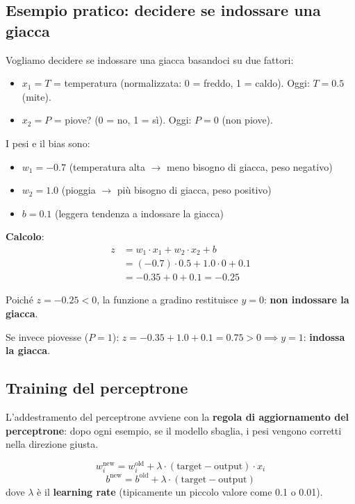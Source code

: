 \documentclass[12pt,a4paper]{article}
\begin{document}
\subsection{Esempio pratico: decidere se indossare una giacca}

\begin{examplebox}
Vogliamo decidere se indossare una giacca basandoci su due fattori:
\begin{itemize}
    \item $x_1 = T$ = temperatura (normalizzata: 0 = freddo, 1 = caldo). Oggi: $T = 0.5$ (mite).
    \item $x_2 = P$ = piove? (0 = no, 1 = s\`i). Oggi: $P = 0$ (non piove).
\end{itemize}

I pesi e il bias sono:
\begin{itemize}
    \item $w_1 = -0.7$ (temperatura alta $\to$ meno bisogno di giacca, peso negativo)
    \item $w_2 = 1.0$ (pioggia $\to$ pi\`u bisogno di giacca, peso positivo)
    \item $b = 0.1$ (leggera tendenza a indossare la giacca)
\end{itemize}

\textbf{Calcolo}:
\begin{align*}
    z &= w_1 \cdot x_1 + w_2 \cdot x_2 + b \\
      &= (-0.7) \cdot 0.5 + 1.0 \cdot 0 + 0.1 \\
      &= -0.35 + 0 + 0.1 = -0.25
\end{align*}

Poich\'e $z = -0.25 < 0$, la funzione a gradino restituisce $y = 0$: \textbf{non indossare la giacca}.

Se invece piovesse ($P = 1$): $z = -0.35 + 1.0 + 0.1 = 0.75 > 0 \implies y = 1$: \textbf{indossa la giacca}.
\end{examplebox}


\subsection{Training del perceptrone}

L'addestramento del perceptrone avviene con la \textbf{regola di aggiornamento del perceptrone}: dopo ogni esempio, se il modello sbaglia, i pesi vengono corretti nella direzione giusta.

\begin{formulabox}
\[
    w_i^{\text{new}} = w_i^{\text{old}} + \lambda \cdot (\text{target} - \text{output}) \cdot x_i
\]
\[
    b^{\text{new}} = b^{\text{old}} + \lambda \cdot (\text{target} - \text{output})
\]
dove $\lambda$ \`e il \textbf{learning rate} (tipicamente un piccolo valore come 0.1 o 0.01).
\end{formulabox}
\end{document}
